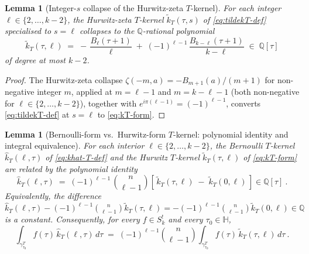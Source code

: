 \documentclass[11pt]{article}
\newtheorem{lemma}[theorem]{Lemma}
\numberwithin{equation}{section}  %
\newcommand{\HH}{\mathbb{H}}
\newcommand{\QQ}{\mathbb{Q}}
\begin{document}
\begin{lemma}[Integer-$s$ collapse of the Hurwitz-zeta $T$-kernel]\label{lem:Hurwitz-collapse}
For each integer $\ell \in \{2, \ldots, k - 2\}$, the Hurwitz-zeta
$T$-kernel $\widetilde{k}_T(\tau, s)$ of \eqref{eq:tildekT-def}
specialised to $s = \ell$ collapses to the $\QQ$-rational polynomial
\begin{equation}\label{eq:kT-form}
  \widetilde{k}_T(\tau, \ell)
  \;=\; -\,\frac{B_\ell(\tau + 1)}{\ell} \;+\; (-1)^{\ell - 1}\,\frac{B_{k - \ell}(\tau + 1)}{k - \ell}
  \;\in\; \QQ[\tau]
\end{equation}
of degree at most $k - 2$.
\end{lemma}

\begin{proof}
The Hurwitz-zeta collapse $\zeta(-m, a) = -B_{m + 1}(a)/(m + 1)$ for
non-negative integer $m$, applied at $m = \ell - 1$ and $m = k - \ell - 1$
(both non-negative for $\ell \in \{2, \ldots, k - 2\}$), together with
$e^{i\pi(\ell - 1)} = (-1)^{\ell - 1}$, converts \eqref{eq:tildekT-def} at
$s = \ell$ to \eqref{eq:kT-form}.
\end{proof}

\begin{lemma}[Bernoulli-form vs.\ Hurwitz-form $T$-kernel: polynomial identity and integral equivalence]\label{lem:T-piece-equiv}
For each interior $\ell \in \{2, \ldots, k - 2\}$, the Bernoulli
$T$-kernel $\widehat{k}_T(\ell, \tau)$ of \eqref{eq:khat-T-def} and the
Hurwitz $T$-kernel $\widetilde{k}_T(\tau, \ell)$ of \eqref{eq:kT-form} are
related by the polynomial identity
\begin{equation}\label{eq:khat-vs-ktilde}
  \widehat{k}_T(\ell, \tau)
  \;=\; (-1)^{\ell - 1}\,\binom{n}{\ell - 1}\!\left[\,\widetilde{k}_T(\tau, \ell) \;-\; \widetilde{k}_T(0, \ell)\,\right]
  \in \QQ[\tau]~.
\end{equation}
Equivalently, the difference
$\widehat{k}_T(\ell, \tau) - (-1)^{\ell - 1}\binom{n}{\ell - 1}\widetilde{k}_T(\tau, \ell)
= -(-1)^{\ell - 1}\binom{n}{\ell - 1}\widetilde{k}_T(0, \ell) \in \QQ$
is a constant.  Consequently, for every $f \in S^!_k$ and every
$\tau_0 \in \HH$,
\begin{equation}\label{eq:T-piece-integral-equiv}
  \int_{\gamma^T_{\tau_0}}\!\! f(\tau)\,\widehat{k}_T(\ell, \tau)\,d\tau
  \;=\; (-1)^{\ell - 1}\binom{n}{\ell - 1}\!\int_{\gamma^T_{\tau_0}}\!\! f(\tau)\,\widetilde{k}_T(\tau, \ell)\,d\tau~.
\end{equation}
\end{lemma}
\end{document}

